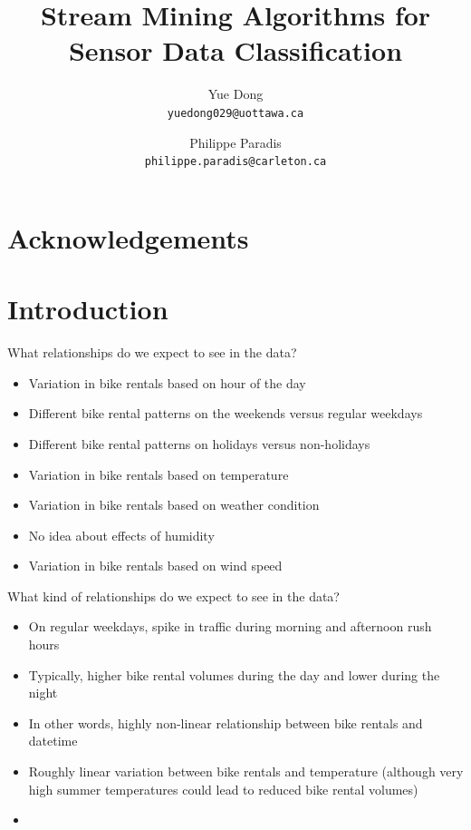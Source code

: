 \documentclass[12pt]{article}
\title{Stream Mining Algorithms for Sensor Data Classification}
\author{
	Yue Dong\\
	\texttt{yuedong029@uottawa.ca}
	\and
	Philippe Paradis\\
	\texttt{philippe.paradis@carleton.ca}
}
\begin{document}
	\singlespace
	\maketitle
	
	\tableofcontents
	\newpage
	\section*{Acknowledgements}
	
	
	\begin{abstract}                %
		
		
	\end{abstract}
	
	\setcounter{secnumdepth}{4}
	
	\section{Introduction}
	\label{sec:introduction}
		What relationships do we expect to see in the data?
		\begin{itemize}
			\item Variation in bike rentals based on hour of the day
			\item Different bike rental patterns on the weekends versus regular weekdays
			\item Different  bike rental patterns on holidays versus non-holidays
			\item Variation in bike rentals based on temperature
			\item Variation in bike rentals based on weather condition
			\item No idea about effects of humidity
			\item Variation in bike rentals based on wind speed
		\end{itemize}
		
		What kind of relationships do we expect to see in the data?
		\begin{itemize}
			\item On regular weekdays, spike in traffic during morning and afternoon rush hours
			\item Typically, higher bike rental volumes during the day and lower during the night
			\item In other words, highly non-linear relationship between bike rentals and datetime
			\item Roughly linear variation between bike rentals and temperature (although very high summer temperatures could lead to reduced bike rental volumes)
			\item 
		\end{itemize}
		
\end{document}
